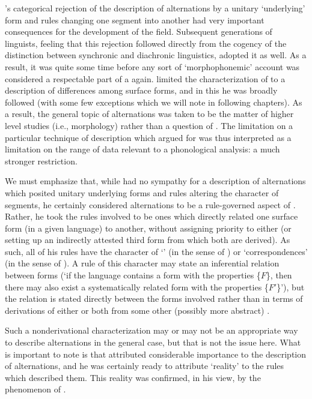 {\Saussure}'s categorical rejection of the description of alternations by
a unitary `underlying' form and rules changing one segment into
another had very important consequences for the development of the
field. Subsequent generations of linguists, feeling that this
rejection followed directly from the cogency of the distinction
between synchronic and diachronic linguistics, adopted it as well. As
a result, it was quite some time before any sort of `morphophonemic'
account was considered a respectable part of a 
again. {\Saussure} limited the characterization of  to a
description of differences among surface forms, and in this he was
broadly followed (with some few exceptions which we will note in
following chapters). As a result, the general topic of alternations was
taken to be the matter of higher level studies (i.e., morphology)
rather than a question of . The limitation on a
particular technique of description which {\Saussure} argued for was thus
interpreted as a limitation on the range of data relevant to a
phonological analysis: a much stronger restriction.

We must emphasize that, while {\Saussure} had no sympathy for a
description of alternations which posited unitary underlying forms and
rules altering the character of segments, he certainly considered
alternations to be a rule-governed aspect of . Rather,
he took the rules involved to be ones which directly related one
surface form (in a given language) to another, without assigning
priority to either (or setting up an indirectly attested third form
from which both are derived). As such, all of his rules have the
character of `' (in the sense of
\citealt{jackendoff:wfrs}) or `correspondences' (in the sense of
\citealt{lopez:thesis}). A rule of this character may state an
inferential relation between forms (`if the language contains a form
with the properties \{$F$\}, then there may also exist a
systematically related form with the properties \{$F\prime$\}'), but
the relation is stated directly between the forms involved rather than
in terms of derivations of either or both from some other (possibly
more abstract) .

Such a nonderivational characterization may or may not be an
appropriate way to describe alternations in the general case, but that
is not the issue here. What is important to note is that {\Saussure}
attributed considerable importance to the description of alternations,
and he was certainly ready to attribute `reality' to the rules which
described them. This reality was confirmed, in his view, by the
phenomenon of .

